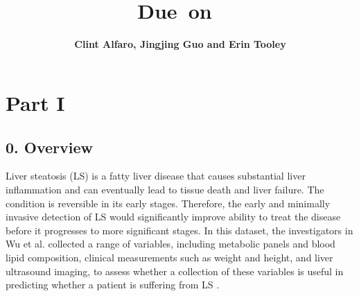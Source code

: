 \documentclass{article}
\title{
\vspace{2in}
\textmd{\textbf{\hmwkClass\\\hmwkTitle}}\\
\normalsize\vspace{0.1in}\small{Due\ on\ \hmwkDueDate}\\
\vspace{3in}
}
\author{\textbf{Clint Alfaro, Jingjing Guo and Erin Tooley}}
\date{} %
\begin{document}
\maketitle
\newpage


\tableofcontents

\newpage



\section{Part I}

\subsection{0. Overview}
Liver steatosis (LS) is a fatty liver disease that causes substantial liver inflammation and can eventually lead to tissue death and liver failure. The condition is reversible in its early stages. Therefore, the early and minimally invasive detection of LS would significantly improve ability to treat the disease before it progresses to more significant stages. In this dataset, the investigators in Wu et al. collected a range of variables, including metabolic panels and blood lipid composition, clinical measurements such as weight and height, and liver ultrasound imaging, to assess whether a collection of these variables is useful in predicting whether a patient is suffering from LS \cite{wu2011}.\\
\end{document}
